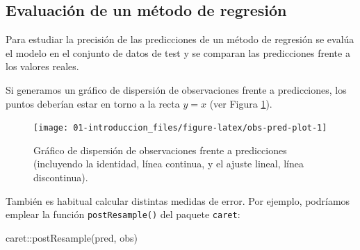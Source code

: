 \documentclass[
  spanish,
]{book}
\newenvironment{Shaded}{\begin{snugshade}}{\end{snugshade}}
\newcommand{\AttributeTok}[1]{\textcolor[rgb]{0.77,0.63,0.00}{#1}}
\newcommand{\CommentTok}[1]{\textcolor[rgb]{0.56,0.35,0.01}{\textit{#1}}}
\newcommand{\DecValTok}[1]{\textcolor[rgb]{0.00,0.00,0.81}{#1}}
\newcommand{\FunctionTok}[1]{\textcolor[rgb]{0.00,0.00,0.00}{#1}}
\newcommand{\NormalTok}[1]{#1}
\newcommand{\OtherTok}[1]{\textcolor[rgb]{0.56,0.35,0.01}{#1}}
\newcommand{\SpecialCharTok}[1]{\textcolor[rgb]{0.00,0.00,0.00}{#1}}
\newcommand{\StringTok}[1]{\textcolor[rgb]{0.31,0.60,0.02}{#1}}
\theoremstyle{break}
\theoremstyle{definition}
\theoremstyle{definition}
\theoremstyle{definition}
\theoremstyle{definition}
\theoremstyle{remark}
\begin{document}
\hypertarget{eval-reg}{%
\subsection{Evaluación de un método de regresión}\label{eval-reg}}

Para estudiar la precisión de las predicciones de un método de regresión se evalúa el
modelo en el conjunto de datos de test y se comparan las predicciones frente a los valores reales.

Si generamos un gráfico de dispersión de observaciones frente a predicciones, los puntos deberían estar en torno a la recta \(y=x\) (ver Figura \ref{fig:obs-pred-plot}).

\begin{Shaded}
\end{Shaded}

\begin{figure}[!htb]

{\centering \texttt{[image: 01-introduccion\_files/figure-latex/obs-pred-plot-1]} 

}

\caption{Gráfico de dispersión de observaciones frente a predicciones (incluyendo la identidad, línea continua, y el ajuste lineal, línea discontinua).}\label{fig:obs-pred-plot}
\end{figure}

También es habitual calcular distintas medidas de error.
Por ejemplo, podríamos emplear la función \texttt{postResample()} del paquete \texttt{caret}:

\begin{Shaded}
\begin{Highlighting}[]
\NormalTok{caret}\SpecialCharTok{::}\FunctionTok{postResample}\NormalTok{(pred, obs)}
\end{Highlighting}
\end{Shaded}
\end{document}
